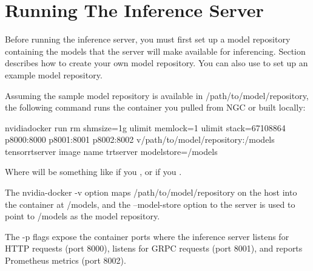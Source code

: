 \documentclass[letterpaper,10pt,english]{sphinxmanual}
\begin{document}
\section{Running The Inference Server}
\label{\detokenize{run:running-the-inference-server}}\label{\detokenize{run:section-running-the-inference-server}}
Before running the inference server, you must first set up a model
repository containing the models that the server will make available
for inferencing. Section {\hyperref[\detokenize{model_repository:section-model-repository}]{}} describes how
to create your own model repository. You can also use
{\hyperref[\detokenize{run:section-example-model-repository}]{}} to set up an example model
repository.

Assuming the sample model repository is available in
/path/to/model/repository, the following command runs the container
you pulled from NGC or built locally:

\begin{sphinxVerbatim}[commandchars=\\\{\}]
\PYGZdl{} nvidia\PYGZhy{}docker run \PYGZhy{}\PYGZhy{}rm \PYGZhy{}\PYGZhy{}shm\PYGZhy{}size=1g \PYGZhy{}\PYGZhy{}ulimit memlock=\PYGZhy{}1 \PYGZhy{}\PYGZhy{}ulimit stack=67108864 \PYGZhy{}p8000:8000 \PYGZhy{}p8001:8001 \PYGZhy{}p8002:8002 \PYGZhy{}v/path/to/model/repository:/models \PYGZlt{}tensorrtserver image name\PYGZgt{} trtserver \PYGZhy{}\PYGZhy{}model\PYGZhy{}store=/models
\end{sphinxVerbatim}

Where  will be something like
 if you {\hyperref[\detokenize{install:section-installing-prebuilt-containers}]{}}, or  if
you {\hyperref[\detokenize{build:section-building-the-server}]{}}.

The nvidia-docker -v option maps /path/to/model/repository on the host
into the container at /models, and the --model-store option to the
server is used to point to /models as the model repository.

The -p flags expose the container ports where the inference server
listens for HTTP requests (port 8000), listens for GRPC requests (port
8001), and reports Prometheus metrics (port 8002).
\end{document}
